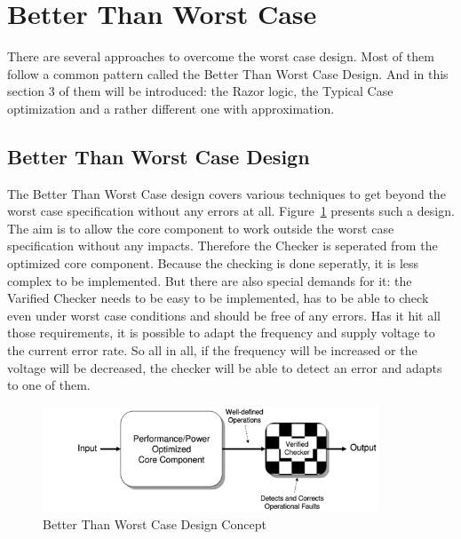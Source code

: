 \documentclass[12pt, a4paper]{article}
\begin{document}
	\section{Better Than Worst Case}\label{sec:new}
	There are several approaches to overcome the worst case design. Most of them follow a common pattern called the Better Than Worst Case Design. And in this section 3 of them will be introduced: the Razor logic, the Typical Case optimization and a rather different one with approximation.
	\subsection{Better Than Worst Case Design}
	The Better Than Worst Case design covers various techniques to get beyond the worst case specification without any errors at all. Figure~\ref{fig:btwc} presents such a design. The aim is to allow the core component to work outside the worst case specification without any impacts. Therefore the Checker is seperated from the optimized core component.   
	Because the checking is done seperatly, it is less complex to be implemented. But there are also special demands for it: the Varified Checker needs to be easy to be implemented, has to be able to check even under worst case conditions and should be free of any errors. Has it hit all those requirements, it is possible to adapt the frequency and supply voltage to the current error rate. So all in all, if the frequency will be increased or the voltage will be decreased, the checker will be able to detect an error and adapts to one of them.\cite{austin}
	\begin{figure} [ht]
		\begin{center}
			\includegraphics[width=10cm]{btwc.png}
		\end{center}
		\caption{Better Than Worst Case Design Concept\cite{austin}
		\label{fig:btwc}}
	\end{figure}
\end{document}

